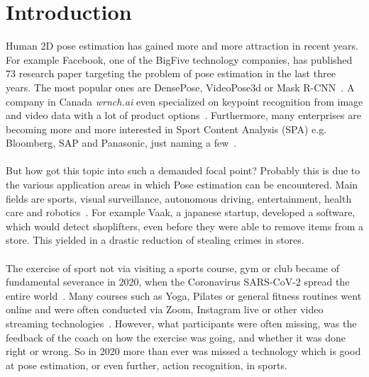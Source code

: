 


\chapter{Introduction} %

\label{introduction} %
Human 2D pose estimation has gained more and more attraction in recent years.
For example Facebook, one of the BigFive technology companies, has published 73 research paper targeting the
problem of pose estimation in the last three years.
The most popular ones are DensePose, VideoPose3d or Mask R-CNN~\cite{fbPub, DensePose, videopose3d, maskrcnn}.
A company in Canada \textit{wrnch.ai} even specialized on keypoint recognition from image and video data with a
lot of product options~\cite{wrnch}.
Furthermore, many enterprises are becoming more and more interested in Sport Content Analysis (SPA)
e.g. Bloomberg, SAP and Panasonic, just naming a few~\cite{sappanasonic, spaBloomberg}.
\\\mbox{}\\
But how got this topic into such a demanded focal point?
Probably this is due to the various application areas in which Pose estimation can be encountered.
Main fields are sports, visual surveillance, autonomous driving, entertainment, health care and
robotics~\cite{olympicsport, surveillance, kinectWalkDepression}.
For example Vaak, a japanese startup, developed a software, which would detect shoplifters,
even before they were able to remove items from a store.
This yielded in a drastic reduction of stealing crimes in stores.
\\\mbox{}\\
The exercise of sport not via visiting a sports course, gym or club became of fundamental severance in 2020,
when the Coronavirus SARS-CoV-2 spread the entire world~\cite{coronarki}.
Many courses such as Yoga, Pilates or general fitness routines went online
and were often conducted via Zoom, Instagram live or other video streaming technologies~\cite{coronalife}.
However, what participants were often missing, was the feedback of the coach on how the exercise was going, and
whether it was done right or wrong.
So in 2020 more than ever was missed a technology which is good at pose estimation, or even further, action
recognition, in sports.
\\\mbox{}\\
